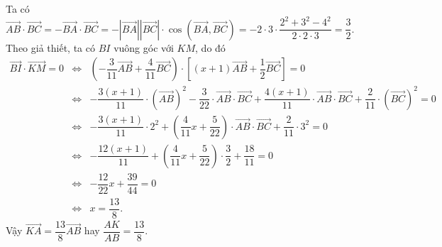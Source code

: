 \begin{bt}
{		Ta có $\overrightarrow{AB}\cdot \overrightarrow{BC} = -\overrightarrow{BA}\cdot\overrightarrow{BC} = - \left|\overrightarrow{BA} \right|\left|\overrightarrow{BC} \right|\cdot\cos\left( \overrightarrow{BA},\overrightarrow{BC} \right) = -2\cdot 3\cdot\dfrac{2^2 + 3^2 - 4^2}{2\cdot 2\cdot 3} = \dfrac{3}{2} $.\\
		Theo giả thiết, ta có $BI$ vuông góc với $KM$, do đó
		\begin{eqnarray*}
			\overrightarrow{BI}\cdot\overrightarrow{KM} = 0 &\Leftrightarrow& \left( -\dfrac{3}{11}\overrightarrow{AB} + \dfrac{4}{11}\overrightarrow{BC} \right)\cdot\left[ (x+1)\overrightarrow{AB} + \dfrac{1}{2}\overrightarrow{BC} \right] = 0\\
			&\Leftrightarrow& -\dfrac{3(x+1)}{11}\cdot\left(\overrightarrow{AB}\right)^2 - \dfrac{3}{22}\cdot \overrightarrow{AB}\cdot\overrightarrow{BC} + \dfrac{4(x+1)}{11}\cdot \overrightarrow{AB}\cdot\overrightarrow{BC} + \dfrac{2}{11}\cdot \left(\overrightarrow{BC}\right)^2 = 0\\
			&\Leftrightarrow& -\dfrac{3(x+1)}{11}\cdot2^2 + \left( \dfrac{4}{11}x + \dfrac{5}{22} \right)\cdot \overrightarrow{AB}\cdot\overrightarrow{BC} + \dfrac{2}{11}\cdot 3^2 = 0\\
			&\Leftrightarrow& -\dfrac{12(x+1)}{11} + \left( \dfrac{4}{11}x + \dfrac{5}{22} \right)\cdot\dfrac{3}{2} + \dfrac{18}{11} = 0\\
			&\Leftrightarrow& -\dfrac{12}{22}x + \dfrac{39}{44} = 0\\
			&\Leftrightarrow& x = \dfrac{13}{8}.
		\end{eqnarray*}
		Vậy $\overrightarrow{KA} = \dfrac{13}{8}\overrightarrow{AB}$ hay $\dfrac{AK}{AB} = \dfrac{13}{8}$.
	}
\end{bt}

